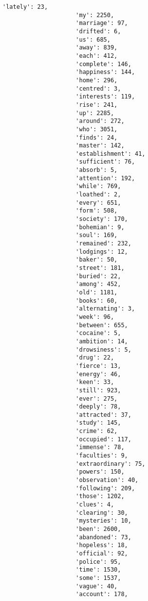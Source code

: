\documentclass[11pt]{article}
\begin{document}
\begin{Verbatim}[commandchars=\\\{\}]
                     'lately': 23,
                     'my': 2250,
                     'marriage': 97,
                     'drifted': 6,
                     'us': 685,
                     'away': 839,
                     'each': 412,
                     'complete': 146,
                     'happiness': 144,
                     'home': 296,
                     'centred': 3,
                     'interests': 119,
                     'rise': 241,
                     'up': 2285,
                     'around': 272,
                     'who': 3051,
                     'finds': 24,
                     'master': 142,
                     'establishment': 41,
                     'sufficient': 76,
                     'absorb': 5,
                     'attention': 192,
                     'while': 769,
                     'loathed': 2,
                     'every': 651,
                     'form': 508,
                     'society': 170,
                     'bohemian': 9,
                     'soul': 169,
                     'remained': 232,
                     'lodgings': 12,
                     'baker': 50,
                     'street': 181,
                     'buried': 22,
                     'among': 452,
                     'old': 1181,
                     'books': 60,
                     'alternating': 3,
                     'week': 96,
                     'between': 655,
                     'cocaine': 5,
                     'ambition': 14,
                     'drowsiness': 5,
                     'drug': 22,
                     'fierce': 13,
                     'energy': 46,
                     'keen': 33,
                     'still': 923,
                     'ever': 275,
                     'deeply': 78,
                     'attracted': 37,
                     'study': 145,
                     'crime': 62,
                     'occupied': 117,
                     'immense': 78,
                     'faculties': 9,
                     'extraordinary': 75,
                     'powers': 150,
                     'observation': 40,
                     'following': 209,
                     'those': 1202,
                     'clues': 4,
                     'clearing': 30,
                     'mysteries': 10,
                     'been': 2600,
                     'abandoned': 73,
                     'hopeless': 18,
                     'official': 92,
                     'police': 95,
                     'time': 1530,
                     'some': 1537,
                     'vague': 40,
                     'account': 178,

\end{Verbatim}
\end{document}
